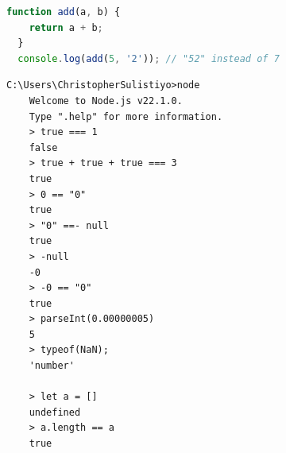 \begin{lstlisting}[language=JavaScript, caption={Example of challenges in JavaScript because of its loosely typed nature that creates 
  lack of type safety, type coercion, and type conversion}]
  function add(a, b) {
    return a + b;
  }
  console.log(add(5, '2')); // "52" instead of 7
\end{lstlisting}

\begin{lstlisting}[language=DOS, caption={Another example of JavaScript challenges}]
    C:\Users\ChristopherSulistiyo>node
    Welcome to Node.js v22.1.0.
    Type ".help" for more information.
    > true === 1
    false
    > true + true + true === 3
    true
    > 0 == "0"
    true
    > "0" ==- null
    true
    > -null
    -0
    > -0 == "0"
    true
    > parseInt(0.00000005)
    5
    > typeof(NaN);
    'number'

    > let a = []
    undefined
    > a.length == a
    true
  \end{lstlisting}

